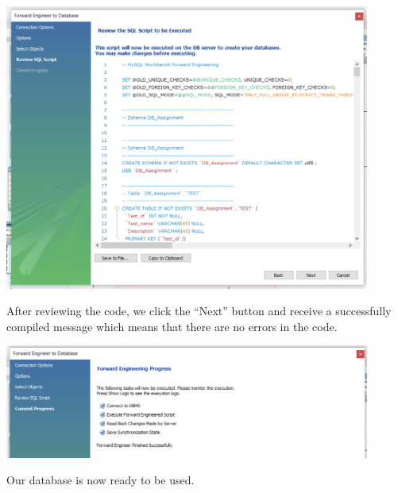 \documentclass[a4paper]{article}
\numberwithin{equation}{section}
\begin{document}
\begin{center}
    \includegraphics[width=0.9\textwidth]{assets/step1.new.png}
\end{center}

After reviewing the code, we click the ``Next'' button and receive a successfully compiled message which means that there are no errors in the code. 

\begin{center}
    \includegraphics[width=0.9\textwidth]{assets/step2.new.png}
\end{center}

Our database is now ready to be used.

\end{document}
